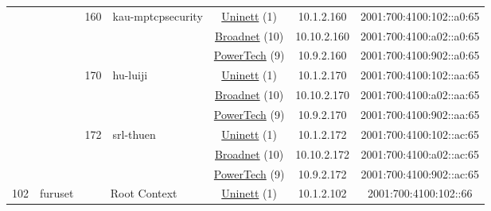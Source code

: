 \begin{small}
\begin{center}
\begin{longtable}{|c|c|c|c|c|c|c|c|}
  &  & \multirow{3}{*}{\tiny{160}} & \multicolumn{1}{|l|}{\multirow{3}{*}{\tiny{kau-mptcpsecurity}}} & \multicolumn{2}{|c|}{\tiny{\href{https://www.uninett.no}{Uninett} (1)}} & \tiny{10.1.2.160} & \tiny{2001:700:4100:102::a0:65} \\* \cline{5-5}\cline{6-6}\cline{7-7}\cline{8-8}
  &  &  &  & \multicolumn{2}{|c|}{\tiny{\href{https://www.broadnet.no}{Broadnet} (10)}} & \tiny{10.10.2.160} & \tiny{2001:700:4100:a02::a0:65} \\* \cline{5-5}\cline{6-6}\cline{7-7}\cline{8-8}
  &  &  &  & \multicolumn{2}{|c|}{\tiny{\href{http://www.powertech.no}{PowerTech} (9)}} & \tiny{10.9.2.160} & \tiny{2001:700:4100:902::a0:65} \\* \cline{3-3}\cline{4-4}\cline{5-5}\cline{6-6}\cline{7-7}\cline{8-8}
  &  & \multirow{3}{*}{\tiny{170}} & \multicolumn{1}{|l|}{\multirow{3}{*}{\tiny{hu-luiji}}} & \multicolumn{2}{|c|}{\tiny{\href{https://www.uninett.no}{Uninett} (1)}} & \tiny{10.1.2.170} & \tiny{2001:700:4100:102::aa:65} \\* \cline{5-5}\cline{6-6}\cline{7-7}\cline{8-8}
  &  &  &  & \multicolumn{2}{|c|}{\tiny{\href{https://www.broadnet.no}{Broadnet} (10)}} & \tiny{10.10.2.170} & \tiny{2001:700:4100:a02::aa:65} \\* \cline{5-5}\cline{6-6}\cline{7-7}\cline{8-8}
  &  &  &  & \multicolumn{2}{|c|}{\tiny{\href{http://www.powertech.no}{PowerTech} (9)}} & \tiny{10.9.2.170} & \tiny{2001:700:4100:902::aa:65} \\* \cline{3-3}\cline{4-4}\cline{5-5}\cline{6-6}\cline{7-7}\cline{8-8}
  &  & \multirow{3}{*}{\tiny{172}} & \multicolumn{1}{|l|}{\multirow{3}{*}{\tiny{srl-thuen}}} & \multicolumn{2}{|c|}{\tiny{\href{https://www.uninett.no}{Uninett} (1)}} & \tiny{10.1.2.172} & \tiny{2001:700:4100:102::ac:65} \\* \cline{5-5}\cline{6-6}\cline{7-7}\cline{8-8}
  &  &  &  & \multicolumn{2}{|c|}{\tiny{\href{https://www.broadnet.no}{Broadnet} (10)}} & \tiny{10.10.2.172} & \tiny{2001:700:4100:a02::ac:65} \\* \cline{5-5}\cline{6-6}\cline{7-7}\cline{8-8}
  &  &  &  & \multicolumn{2}{|c|}{\tiny{\href{http://www.powertech.no}{PowerTech} (9)}} & \tiny{10.9.2.172} & \tiny{2001:700:4100:902::ac:65} \\ \hline
 \multirow{30}{*}{\tiny{102}} & \multicolumn{1}{|l|}{\multirow{30}{*}{\tiny{furuset}}} & \multicolumn{2}{|c|}{\multirow{3}{*}{\tiny{Root Context}}} & \multicolumn{2}{|c|}{\tiny{\href{https://www.uninett.no}{Uninett} (1)}} & \tiny{10.1.2.102} & \tiny{2001:700:4100:102::66} \\* \cline{5-5}\cline{6-6}\cline{7-7}\cline{8-8}

\end{longtable}
\end{center}
\end{small}

